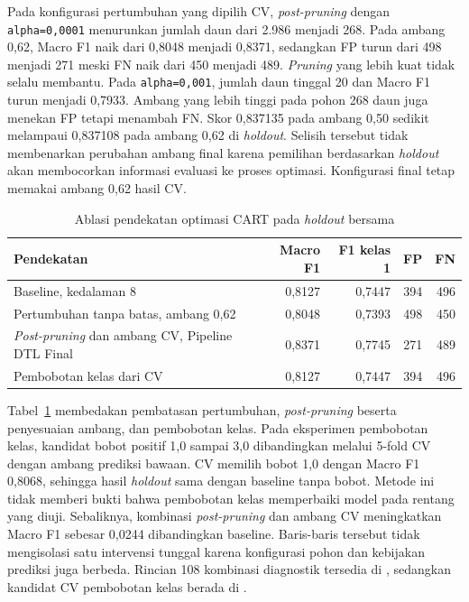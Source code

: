 Pada konfigurasi pertumbuhan yang dipilih CV, \textit{post-pruning} dengan \texttt{alpha=0,0001} menurunkan jumlah daun dari 2.986 menjadi 268. Pada ambang 0,62, Macro F1 naik dari 0,8048 menjadi 0,8371, sedangkan FP turun dari 498 menjadi 271 meski FN naik dari 450 menjadi 489. \textit{Pruning} yang lebih kuat tidak selalu membantu. Pada \texttt{alpha=0,001}, jumlah daun tinggal 20 dan Macro F1 turun menjadi 0,7933. Ambang yang lebih tinggi pada pohon 268 daun juga menekan FP tetapi menambah FN. Skor 0,837135 pada ambang 0,50 sedikit melampaui 0,837108 pada ambang 0,62 di \textit{holdout}. Selisih tersebut tidak membenarkan perubahan ambang final karena pemilihan berdasarkan \textit{holdout} akan membocorkan informasi evaluasi ke proses optimasi. Konfigurasi final tetap memakai ambang 0,62 hasil CV.

\begin{table}[H]
    \centering
    \caption{Ablasi pendekatan optimasi CART pada \textit{holdout} bersama}
    \label{tab-dtl-method}
    \begin{tabular}{lrrrr}
        \hline
        Pendekatan                                              & Macro F1 & F1 kelas 1 & FP  & FN  \\
        \hline
        Baseline, kedalaman 8                                   & 0,8127   & 0,7447     & 394 & 496 \\
        Pertumbuhan tanpa batas, ambang 0,62                    & 0,8048   & 0,7393     & 498 & 450 \\
        \textit{Post-pruning} dan ambang CV, Pipeline DTL Final & 0,8371   & 0,7745     & 271 & 489 \\
        Pembobotan kelas dari CV                                & 0,8127   & 0,7447     & 394 & 496 \\
        \hline
    \end{tabular}
\end{table}

Tabel~\ref{tab-dtl-method} membedakan pembatasan pertumbuhan, \textit{post-pruning} beserta penyesuaian ambang, dan pembobotan kelas. Pada eksperimen pembobotan kelas, kandidat bobot positif 1,0 sampai 3,0 dibandingkan melalui 5-fold CV dengan ambang prediksi bawaan. CV memilih bobot 1,0 dengan Macro F1 0,8068, sehingga hasil \textit{holdout} sama dengan baseline tanpa bobot. Metode ini tidak memberi bukti bahwa pembobotan kelas memperbaiki model pada rentang yang diuji. Sebaliknya, kombinasi \textit{post-pruning} dan ambang CV meningkatkan Macro F1 sebesar 0,0244 dibandingkan baseline. Baris-baris tersebut tidak mengisolasi satu intervensi tunggal karena konfigurasi pohon dan kebijakan prediksi juga berbeda. Rincian 108 kombinasi diagnostik tersedia di , sedangkan kandidat CV pembobotan kelas berada di .

